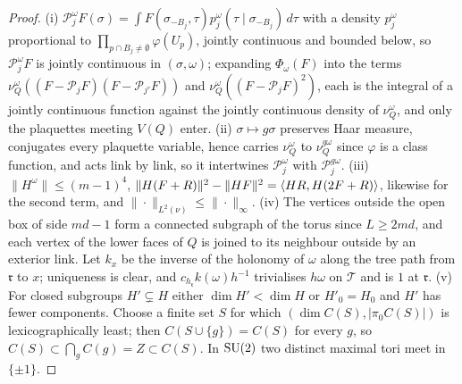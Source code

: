 \begin{proof}
(i) $\mathcal P^\omega_jF(\sigma)=\int F(\sigma_{-B_j},\tau)p^\omega_j(\tau\mid
\sigma_{-B_j})\,d\tau$ with a density $p^\omega_j$ proportional to $\prod_{p
\cap B_j\ne\emptyset}\varphi(U_p)$, jointly continuous and bounded below, so
$\mathcal P^\omega_jF$ is jointly continuous in $(\sigma,\omega)$; expanding
$\Phi_\omega(F)$ into the terms $\nu^\omega_Q((F-\mathcal P_jF)(F-\mathcal P_{j'}
F))$ and $\nu^\omega_Q((F-\mathcal P_jF)^2)$, each is the integral of a
jointly continuous function against the jointly continuous density of
$\nu^\omega_Q$, and only the plaquettes meeting $V(Q)$ enter.
(ii) $\sigma\mapsto g\sigma$ preserves Haar measure, conjugates every
plaquette variable, hence carries $\nu^\omega_Q$ to $\nu^{g\omega}_Q$ since
$\varphi$ is a class function, and acts link by link, so it intertwines
$\mathcal P^\omega_j$ with $\mathcal P^{g\omega}_j$.
(iii) $\|H^\omega\|\le(m-1)^4$, $\|H(F+R)\|^2-\|HF\|^2=\langle HR,H(2F+R)\rangle$,
likewise for the second term, and $\|\cdot\|_{L^2(\nu)}\le\|\cdot\|_\infty$.
(iv) The vertices outside the open box of side $md-1$ form a connected
subgraph of the torus since $L\ge2md$, and each vertex of the lower faces
of $Q$ is joined to its neighbour outside by an exterior link. Let $k_x$ be
the inverse of the holonomy of $\omega$ along the tree path from $\mathfrak r$
to $x$; uniqueness is clear, and $c_{h_{\mathfrak r}}k(\omega)h^{-1}$
trivialises $h\omega$ on $\mathcal T$ and is $1$ at $\mathfrak r$.
(v) For closed subgroups $H'\subsetneq H$ either $\dim H'<\dim H$ or $H'_0
=H_0$ and $H'$ has fewer components. Choose a finite set $S$ for which
$(\dim C(S),|\pi_0C(S)|)$ is lexicographically least; then $C(S\cup\{g\})=C
(S)$ for every $g$, so $C(S)\subset\bigcap_gC(g)=Z\subset C(S)$. In $\mathrm{SU}(2)$
two distinct maximal tori meet in $\{\pm1\}$.
\end{proof}

